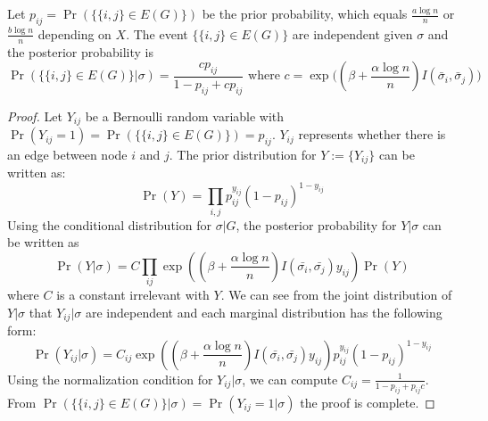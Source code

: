 \documentclass{article}
\begin{document}
\begin{lemma}\label{lem:post_independent}
	Let $p_{ij}=\Pr(\{\{i,j\} \in E(G) \})$ be the prior probability, which equals $\frac{a\log n}{n}$ or $\frac{b\log n}{n}$ depending on $X$.
	The event $\{\{i,j\} \in E(G) \}$ are independent given $\sigma$ and the posterior probability is
	\begin{equation}
	\Pr(\{\{i,j\} \in E(G) \} | \sigma) = \frac{c p_{ij} }{1-p_{ij} + cp_{ij}} \text{ where  } c= \exp\Big((\beta + \frac{\alpha \log n}{n} ) I(\bar{\sigma}_i, \bar{\sigma}_j) \Big)
	\end{equation}
\end{lemma}
\begin{proof}
	Let $Y_{ij}$ be a Bernoulli random variable with $\Pr(Y_{ij} = 1) = \Pr(\{\{i,j\} \in E(G)\}) = p_{ij}$. $Y_{ij}$ represents whether there is an edge between node $i$ and $j$.
	The prior distribution for $Y:=\{Y_{ij}\}$ can be written as:
	$$
	\Pr(Y) = \prod_{i,j} p_{ij}^{y_{ij}} (1-p_{ij})^{1-y_{ij}}
	$$ 
	Using the conditional distribution for $\sigma|G$, the posterior probability for $Y| \sigma$ can be written as
	$$
	\Pr(Y|\sigma) = C\prod_{ij} \exp((\beta + \frac{\alpha \log n}{n})I(\bar{\sigma_i}, \bar{\sigma_j} )y_{ij}) \Pr(Y)
	$$
	where $C$ is a constant irrelevant with $Y$.
	We can see from the joint distribution of $Y|\sigma$ that $Y_{ij} | \sigma$ are independent and each marginal distribution has the following form:
	$$
	\Pr(Y_{ij} | \sigma) = C_{ij} \exp((\beta + \frac{\alpha \log n}{n})I(\bar{\sigma_i}, \bar{\sigma_j} )y_{ij}) p_{ij}^{y_{ij}} (1-p_{ij})^{1-y_{ij}}
	$$
	Using the normalization condition for $Y_{ij} | \sigma $, we can compute $C_{ij} = \frac{1}{1-p_{ij} + p_{ij}c}$. From $\Pr(\{\{i,j\} \in E(G) \} | \sigma) =\Pr(Y_{ij}=1|\sigma)$ the proof is complete.
\end{proof}
\end{document}

